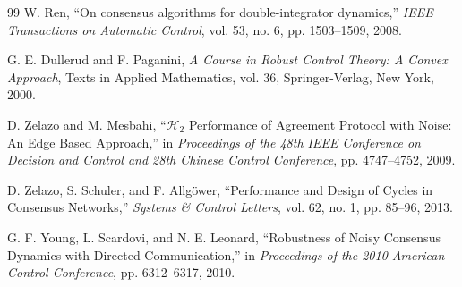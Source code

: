 \documentclass[11pt,a4paper]{article}
\begin{document}
\begin{thebibliography}{99}
W. Ren,
``On consensus algorithms for double-integrator dynamics,''
\textit{IEEE Transactions on Automatic Control},
vol. 53, no. 6, pp. 1503--1509, 2008.

G. E. Dullerud and F. Paganini,
\textit{A Course in Robust Control Theory: A Convex Approach},
Texts in Applied Mathematics, vol. 36,
Springer-Verlag, New York, 2000.

D. Zelazo and M. Mesbahi,
``$\mathcal{H}_2$ Performance of Agreement Protocol with Noise:
An Edge Based Approach,''
in \textit{Proceedings of the 48th IEEE Conference on Decision
	and Control and 28th Chinese Control Conference},
pp. 4747--4752, 2009.

D. Zelazo, S. Schuler, and F. Allg{\"o}wer,
``Performance and Design of Cycles in Consensus Networks,''
\textit{Systems \& Control Letters},
vol. 62, no. 1, pp. 85--96, 2013.

G. F. Young, L. Scardovi, and N. E. Leonard,
``Robustness of Noisy Consensus Dynamics with Directed Communication,''
in \textit{Proceedings of the 2010 American Control Conference},
pp. 6312--6317, 2010.

\end{thebibliography}
\end{document}
